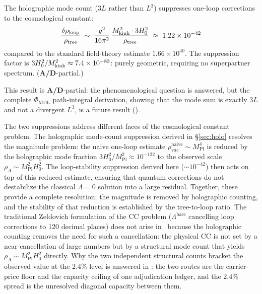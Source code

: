 \documentclass[11pt]{article}
\theoremstyle{remark}
\newcommand{\GTE}{\text{GTE}}
\newcommand{\PHIMDL}{\Phi_{\mathrm{MDL}}}
\newcommand{\Mkink}{M_{\rm kink}}
\newcommand{\Hnought}{H_0}
\newcommand{\CatAD}{\textbf{A/D}}
\begin{document}
\begin{tcolorbox}[colback=blue!5,colframe=blue!40!black,
  title={\textbf{Key Result: Holographic Non-Renormalization}},
  fonttitle=\bfseries,left=6pt,right=6pt,top=5pt,bottom=5pt,breakable]
\small
The holographic mode count ($3L$ rather than $L^3$) suppresses one-loop
corrections to the cosmological constant:
\[
  \frac{\delta\rho_{\rm loop}}{\rho_{\rm tree}}
  \;\sim\; \frac{g^2}{16\pi^2}\,\frac{\Mkink^2\cdot 3\Hnought^2}{\rho_{\rm tree}}
  \;\approx\; 1.22\times10^{-42}
\]
compared to the standard field-theory estimate $1.66\times10^{40}$.
The suppression factor is $3\Hnought^2/\Mkink^2\approx7.4\times10^{-83}$:
purely geometric, requiring no superpartner spectrum.  (\CatAD-partial.)
\end{tcolorbox}

This result is \CatAD-partial: the phenomenological question is answered, but the
complete $\PHIMDL$ path-integral derivation, showing that the mode sum is exactly
$3L$ and not a divergent $L^3$, is a future result ().

The two suppressions address different faces of the cosmological constant problem.
The holographic mode-count suppression derived in \S\ref{sec:holo} resolves the
magnitude problem: the naive one-loop estimate
$\rho_\mathrm{vac}^\mathrm{naive} \sim M_\mathrm{Pl}^4$ is reduced by the
holographic mode fraction $3H_0^2/M_\mathrm{Pl}^2 \approx 10^{-122}$ to the
observed scale $\rho_\Lambda \sim M_\mathrm{Pl}^2 H_0^2$.
The loop-stability suppression derived here ($\sim 10^{-42}$) then acts on top of
this reduced estimate, ensuring that quantum corrections do not destabilize the
classical $\Lambda = 0$ solution into a large residual.
Together, these provide a complete resolution: the magnitude is removed by
holographic counting, and the stability of that reduction is established by the
tree-to-loop ratio.
The traditional Zeldovich formulation of the CC problem ($\Lambda^\mathrm{bare}$
cancelling loop corrections to 120 decimal places) does not arise in \GTE\ because
the holographic counting removes the need for such a cancellation: the physical CC
is not set by a near-cancellation of large numbers but by a structural mode count
that yields $\rho_\Lambda \sim M_\mathrm{Pl}^2 H_0^2$ directly.
Why the two independent structural counts bracket the observed value at the
$2.4\%$ level is answered in : the two routes are the
carrier-price floor and the capacity ceiling of one adjudication ledger, and
the $2.4\%$ spread is the unresolved diagonal capacity between them.
\end{document}
